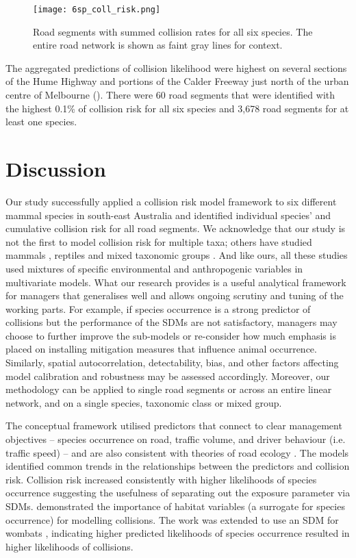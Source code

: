 \begin{figure*}[!t]
  \centering
  \texttt{[image: 6sp\_coll\_risk.png]}
  \caption[Road segments with predictions of high collision likelihood for six mammal species]{Road segments with summed collision rates for all six species. The entire road network is shown as faint gray lines for context.}
  \label{6sp_collrisk}
\end{figure*}

The aggregated predictions of collision likelihood were highest on several sections of the Hume Highway and portions of the Calder Freeway just north of the urban centre of Melbourne (). There were 60 road segments that were identified with the highest 0.1\% of collision risk for all six species and 3,678 road segments for at least one species.

\section{Discussion}

Our study successfully applied a collision risk model framework to six different mammal species in south-east Australia and identified individual species' and cumulative collision risk for all road segments. We acknowledge that our study is not the first to model collision risk for multiple taxa; others have studied mammals \citep[e.g.][]{clev02,cser13,jaar06}, reptiles \citep[e.g.][]{guns12,lang12} and mixed taxonomic groups \citep[e.g.][]{clev02,garr15,lang09,litv08}.  And like ours, all these studies used mixtures of specific environmental and anthropogenic variables in multivariate models. What our research provides is a useful analytical framework for managers that generalises well and allows ongoing scrutiny and tuning of the working parts.  For example, if species occurrence is a strong predictor of collisions but the performance of the SDMs are not satisfactory, managers may choose to further improve the sub-models or re-consider how much emphasis is placed on installing mitigation measures that influence animal occurrence.  Similarly, spatial autocorrelation, detectability, bias, and other factors affecting model calibration and robustness may be assessed accordingly. Moreover, our methodology can be applied to single road segments or across an entire linear network, and on a single species, taxonomic class or mixed group.

The conceptual framework utilised predictors that connect to clear management objectives -- species occurrence on road, traffic volume, and driver behaviour (i.e. traffic speed) -- and are also consistent with theories of road ecology \citep[see][]{form03}. The models identified common trends in the relationships between the predictors and collision risk. Collision risk increased consistently with higher likelihoods of species occurrence suggesting the usefulness of separating out the exposure parameter via SDMs. \cite{roge09} demonstrated the importance of habitat variables (a surrogate for species occurrence) for modelling collisions. The work was extended to use an SDM for wombats \citep{roge12}, indicating higher predicted likelihoods of species occurrence resulted in higher likelihoods of collisions.

